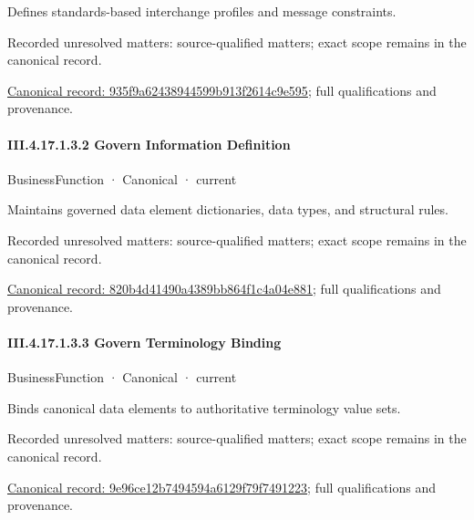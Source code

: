 Defines standards-based interchange profiles and message constraints.


{\small Recorded unresolved matters: source-qualified matters; exact scope remains in the canonical record.}\par
{\footnotesize \href{../../../../continuum/business/business-function/935f9a62438944599b913f2614c9e595.md}{Canonical record: 935f9a62438944599b913f2614c9e595}; full qualifications and provenance.}\par
\paragraph*{III.4.17.1.3.2 Govern Information Definition}
\label{navigation:III.4.17.1.3.2}

\label{element:820b4d41490a4389bb864f1c4a04e881}
{\small BusinessFunction · Canonical · current}\par

Maintains governed data element dictionaries, data types, and structural rules.


{\small Recorded unresolved matters: source-qualified matters; exact scope remains in the canonical record.}\par
{\footnotesize \href{../../../../continuum/business/business-function/820b4d41490a4389bb864f1c4a04e881.md}{Canonical record: 820b4d41490a4389bb864f1c4a04e881}; full qualifications and provenance.}\par
\paragraph*{III.4.17.1.3.3 Govern Terminology Binding}
\label{navigation:III.4.17.1.3.3}

\label{element:9e96ce12b7494594a6129f79f7491223}
{\small BusinessFunction · Canonical · current}\par

Binds canonical data elements to authoritative terminology value sets.


{\small Recorded unresolved matters: source-qualified matters; exact scope remains in the canonical record.}\par
{\footnotesize \href{../../../../continuum/business/business-function/9e96ce12b7494594a6129f79f7491223.md}{Canonical record: 9e96ce12b7494594a6129f79f7491223}; full qualifications and provenance.}\par
